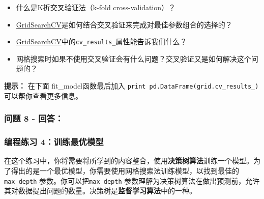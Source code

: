 \documentclass[11pt]{article}
\providecommand{\tightlist}{%
      \setlength{\itemsep}{0pt}\setlength{\parskip}{0pt}}
\begin{document}
\begin{itemize}
\tightlist
\item
  什么是K折交叉验证法（k-fold cross-validation）？
\item
  \href{http://scikit-learn.org/stable/modules/generated/sklearn.model_selection.GridSearchCV.html}{GridSearchCV}是如何结合交叉验证来完成对最佳参数组合的选择的？
\item
  \href{http://scikit-learn.org/stable/modules/generated/sklearn.model_selection.GridSearchCV.html}{GridSearchCV}中的\texttt{\textquotesingle{}cv\_results\_\textquotesingle{}}属性能告诉我们什么？
\item
  网格搜索时如果不使用交叉验证会有什么问题？交叉验证又是如何解决这个问题的？
\end{itemize}

\textbf{提示：} 在下面 fit\_model函数最后加入
\texttt{print\ pd.DataFrame(grid.cv\_results\_)} 可以帮你查看更多信息。

    \subsubsection{问题 8 - 回答：}\label{ux95eeux9898-8---ux56deux7b54}

    \subsubsection{编程练习
4：训练最优模型}\label{ux7f16ux7a0bux7ec3ux4e60-4ux8badux7ec3ux6700ux4f18ux6a21ux578b}

在这个练习中，你将需要将所学到的内容整合，使用\textbf{决策树算法}训练一个模型。为了得出的是一个最优模型，你需要使用网格搜索法训练模型，以找到最佳的
\texttt{\textquotesingle{}max\_depth\textquotesingle{}}
参数。你可以把\texttt{\textquotesingle{}max\_depth\textquotesingle{}}
参数理解为决策树算法在做出预测前，允许其对数据提出问题的数量。决策树是\textbf{监督学习算法}中的一种。
\end{document}
